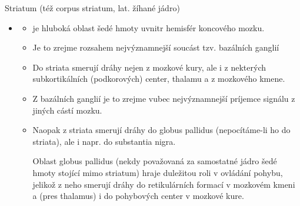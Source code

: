 \documentclass[journal,onecolumn]{IEEEtrancz}
\begin{document}
Striatum (též corpus striatum, lat. žíhané jádro) 
\begin{itemize}
	\item 
	\begin{itemize}
		\item je hluboká oblast šedé hmoty uvnitr hemisfér koncového mozku. 
		\item Je to zrejme rozsahem nejvýznamnejší soucást tzv. bazálních ganglií
			\vspace{3mm}
		\item Do striata smerují dráhy nejen z mozkové kury, ale i z nekterých subkortikálních (podkorových) center, thalamu a z mozkového kmene. 
		\item Z bazálních ganglií je to zrejme vubec nejvýznamnejší príjemce signálu z jiných cástí mozku. 
		\item Naopak z striata smerují dráhy do globus pallidus (nepocítáme-li ho do striata), ale i napr. do substantia nigra.

Oblast globus pallidus (nekdy považovaná za samostatné jádro šedé hmoty stojící mimo striatum) hraje duležitou roli v ovládání pohybu, jelikož z neho smerují dráhy do retikulárních formací v mozkovém kmeni a (pres thalamus) i do pohybových center v mozkové kure. 
	\end{itemize}
\end{itemize}
\end{document}
